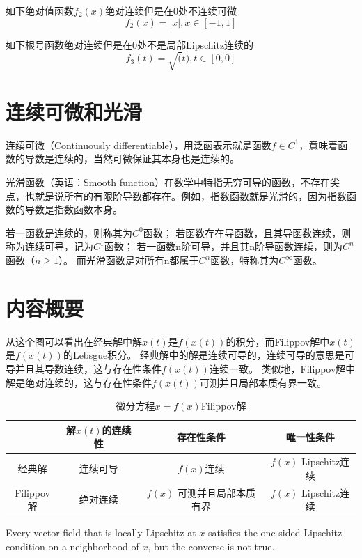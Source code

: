 如下绝对值函数\(f_2(x)\)绝对连续但是在0处不连续可微 \[
f_2(x)=|x|, x\in [-1,1]
\]

如下根号函数绝对连续但是在0处不是局部Lipschitz连续的 \[
f_3(t)=\sqrt(t),t\in [0,0]
\]

\section{连续可微和光滑}

连续可微（Continuously differentiable），用泛函表示就是函数\(f\in C^1\)，意味着函数的导数是连续的，当然可微保证其本身也是连续的。

光滑函数（英语：Smooth function）在数学中特指无穷可导的函数，不存在尖点，也就是说所有的有限阶导数都存在。例如，指数函数就是光滑的，因为指数函数的导数是指数函数本身。

\begin{definition}[光滑函数]
  若一函数是连续的，则称其为\(C^{0}\)函数；
  若函数存在导函数，且其导函数连续，则称为连续可导，记为\(C^1\)函数；
  若一函数n阶可导，并且其n阶导函数连续，则为\(C^{n}\)函数（\(n\geq 1\)）。
  而光滑函数是对所有n都属于\(C^{n}\)函数，特称其为\(C^{\infty }\)函数。
\end{definition}


\section{内容概要}

从这个图可以看出在经典解中解$x(t)$是$f(x(t))$的积分，而Filippov解中$x(t)$是$f(x(t))$的Lebsgue积分。
经典解中的解是连续可导的，连续可导的意思是可导并且其导数连续，这与存在性条件$f(x(t))$连续一致。
类似地，Filippov解中解是绝对连续的，这与存在性条件$f(x(t))$可测并且局部本质有界一致。

\begin{table}[!htp]
  \centering
  \begin{tabular}{|c|c|c|c|}
    \hline
    & 解$x(t)$的连续性 & 存在性条件 & 唯一性条件 \\\hline
    经典解 & 连续可导 & 
    $f(x)$连续 & $f(x)$ Lipschitz连续\\\hline
    Filippov解 & 绝对连续 & 
    $f(x)$ 可测并且局部本质有界 & $f(x)$ Lipschitz连续 \\\hline
  \end{tabular}
  \caption{微分方程$\dot{x}=f(x)$Filippov解}
\end{table}

Every vector field that is locally Lipschitz at $x$ satisfies the one-sided Lipschitz condition on a neighborhood of $x$, but the converse is not true.
